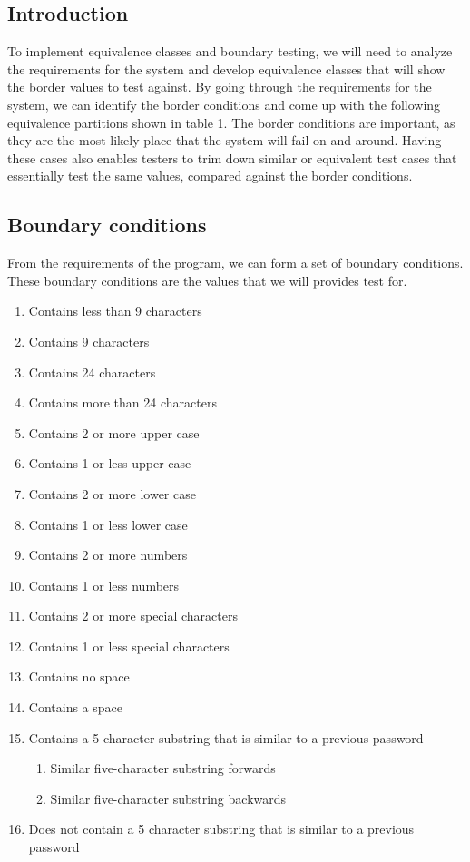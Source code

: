\documentclass[12pt,letterpaper]{article}
\begin{document}
\subsection{Introduction}
To implement equivalence classes and boundary testing, we will need to analyze the requirements
for the system and develop equivalence classes that will show the border values to test against.
By going through the requirements for the system, we can identify the border conditions and
come up with the following equivalence partitions shown in table 1. The border conditions are important,
as they are the most likely place that the system will fail on and around.  Having these
cases also enables testers to trim down similar or equivalent test cases that essentially
test the same values, compared against the border conditions.

\subsection{Boundary conditions}

From the requirements of the program, we can form a set of boundary conditions. These
boundary conditions are the values that we will provides test for.

\begin{enumerate}
\item Contains less than 9 characters
\item Contains 9 characters
\item Contains 24 characters
\item Contains more than 24 characters
\item Contains 2 or more upper case
\item Contains 1 or less upper case
\item Contains 2 or more lower case
\item Contains 1 or less lower case
\item Contains 2 or more numbers
\item Contains 1 or less numbers
\item Contains 2 or more special characters
\item Contains 1 or less special characters
\item Contains no space
\item Contains a space
\item Contains a 5 character substring that is similar to a previous password
\begin{enumerate}
\item Similar five-character substring forwards
\item Similar five-character substring backwards
\end{enumerate}
\item Does not contain a 5 character substring that is similar to a previous password
\end{enumerate}
\end{document}
